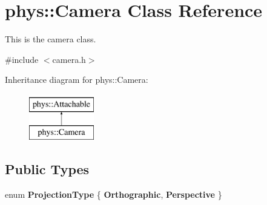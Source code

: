 \hypertarget{classphys_1_1Camera}{
\section{phys::Camera Class Reference}
\label{d9/df8/classphys_1_1Camera}
}


This is the camera class.  




{\ttfamily \#include $<$camera.h$>$}

Inheritance diagram for phys::Camera:\begin{figure}[H]
\begin{center}
\leavevmode
\includegraphics[height=2.000000cm]{d9/df8/classphys_1_1Camera}
\end{center}
\end{figure}
\subsection*{Public Types}
\begin{DoxyCompactItemize}
\item 
enum {\bfseries ProjectionType} \{ {\bfseries Orthographic}, 
{\bfseries Perspective}
 \}
\end{DoxyCompactItemize}
